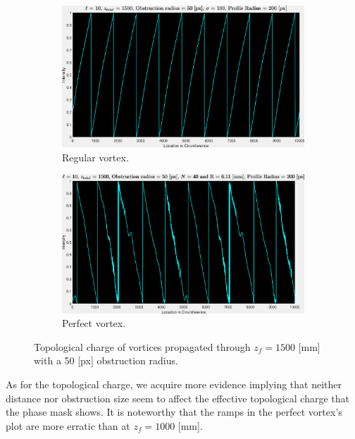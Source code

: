 \begin{figure}[htbp]
    \centering
    \begin{subfigure}[b]{0.45\textwidth}
        \centering
        \includegraphics[width=\textwidth]{images/c04/type=0_r=50_zi=0_zf=1500_TC.eps}
        \caption{Regular vortex.}
    \end{subfigure}
    \hfill
    \begin{subfigure}[b]{0.45\textwidth}
        \centering
        \includegraphics[width=\textwidth]{images/c04/type=1_r=50_zi=0_zf=1500_TC.eps}
        \caption{Perfect vortex.}
    \end{subfigure}
    \caption{Topological charge of vortices propagated through $z_f = 1500$ [mm] with a 50 [px] obstruction radius.}
    \label{fig:Vortices_r=50_z=1500_TC}
\end{figure}

As for the topological charge, we acquire more evidence implying that neither distance nor obstruction size seem to affect the effective topological charge that the phase mask shows. It is noteworthy that the ramps in the perfect vortex's plot are more erratic than at $z_f = 1000$ [mm].

